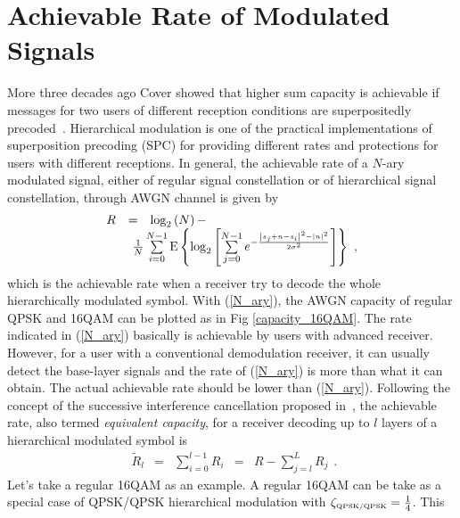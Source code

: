 \documentclass[10pt,fleqn, twocolumn]{IEEEtran}
\begin{document}
\section{Achievable Rate of Modulated Signals~\label{Info_Theory}}
More three decades ago Cover showed that higher sum capacity is
achievable if messages for two users of different reception
conditions are superpositedly precoded~\cite{Cover72}.
Hierarchical modulation is one of the practical implementations of
superposition precoding (SPC) for providing different rates and
protections for users with different receptions. In general, the
achievable rate of a $N$-ary modulated signal, either of regular
signal constellation or of hierarchical signal constellation,
through AWGN channel is given by~\cite{Unge82}
\begin{equation}
\begin{array}{lcl}
R&=&\log_{2}\left(N\right)-\\
&&\hspace{-0.20in}\frac{1}{N}\sum\limits_{i=0}^{N-1}\mbox{E}\left\{\log_{2}\left[\sum\limits_{j=0}^{N-1}e^{-\frac{\left|s_{j}+n-s_{i}\right|^2-\left|n\right|^2}{2\sigma^2}}\right]\right\}\
,
\end{array}\label{N_ary}
\end{equation}
\noindent which is the achievable rate when a receiver try to
decode the whole hierarchically modulated symbol. With
(\ref{N_ary}), the AWGN capacity of regular QPSK and 16QAM can be
plotted as in Fig \ref{capacity_16QAM}. The rate indicated in
(\ref{N_ary}) basically is achievable by users with advanced
receiver. However, for a user with a conventional demodulation
receiver, it can usually detect the base-layer signals and the
rate of (\ref{N_ary}) is more than what it can obtain. The actual
achievable rate should be lower than (\ref{N_ary}). Following the
concept of the successive interference cancellation proposed
in~\cite{Cover72}, the achievable rate, also termed {\em
equivalent capacity}, for a receiver decoding up to $l$ layers of
a hierarchical modulated symbol is~\cite{Huber94}
\begin{equation}
\begin{array}{rcccl}
\tilde{R}_{l}&=&\sum\limits_{i=0}^{l-1}R_{i}& = &
R-\sum\limits_{j=l}^{L}{R}_{j}
\end{array}.\label{R_equiv}
\end{equation}
\noindent Let's take a regular 16QAM as an example. A regular
16QAM can be take as a special case of QPSK/QPSK hierarchical
modulation with $\zeta_{\mbox{\tiny QPSK/QPSK}}=\frac{1}{4}$. This
\end{document}
